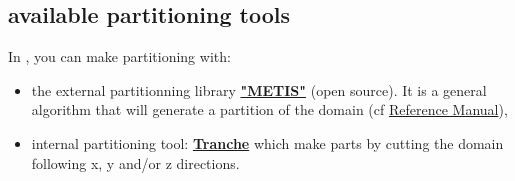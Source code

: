 \subsection{\trust available partitioning tools} \label{partitioner}
In \trust, you can make partitioning with:
\begin{itemize}
\item the external partitionning library \href{http://glaros.dtc.umn.edu/gkhome/views/metis}{\textbf{"METIS"}} (open source). It is a general algorithm that will generate a partition of the domain (cf \href{../../Outils/TRIOXDATA/XTriou/doc.pdf\#partitionneurmetis}{\trust Reference Manual}),
\begin{center}
\end{center}

\item internal \trust partitioning tool: \href{../../Outils/TRIOXDATA/XTriou/doc.pdf\#partitionneurtranche}{\textbf{Tranche}} which make parts by cutting the domain following x, y and/or z directions.
    \begin{center}
    \end{center}



\end{itemize}
